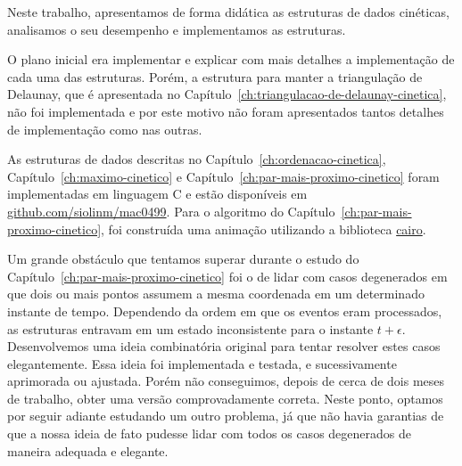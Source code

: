 
\label{cap:conclusao}

Neste trabalho, apresentamos de forma didática as estruturas de dados cinéticas, analisamos o seu desempenho e
implementamos as estruturas.

O plano inicial era implementar e explicar com mais detalhes a implementação de cada uma das estruturas.
Porém, a estrutura para manter a triangulação de Delaunay, que é apresentada no
Capítulo~\ref{ch:triangulacao-de-delaunay-cinetica}, não foi implementada e por este motivo não foram apresentados
tantos detalhes de implementação como nas outras.

As estruturas de dados descritas no Capítulo~\ref{ch:ordenacao-cinetica},
Capítulo~\ref{ch:maximo-cinetico} e Capítulo~\ref{ch:par-mais-proximo-cinetico} foram implementadas
em linguagem C e estão disponíveis em \href{https://github
.com/siolinm/mac0499/tree/main/implementacao}{github.com/siolinm/mac0499}.
Para o algoritmo do Capítulo~\ref{ch:par-mais-proximo-cinetico}, foi construída uma animação
utilizando a biblioteca \href{https://www.cairographics.org/}{cairo}.

Um grande obstáculo que tentamos superar durante o estudo do Capítulo~\ref{ch:par-mais-proximo-cinetico}
foi o de lidar com casos degenerados em que dois ou mais pontos assumem a mesma coordenada em um
determinado instante de tempo.
Dependendo da ordem em que os eventos eram processados, as estruturas entravam em um estado inconsistente para
o instante $t + \epsilon$.
Desenvolvemos uma ideia combinatória original para tentar resolver estes casos elegantemente.
Essa ideia foi implementada e testada, e sucessivamente aprimorada ou ajustada.
Porém não conseguimos, depois de cerca de dois meses de trabalho, obter uma versão comprovadamente correta.
Neste ponto, optamos por seguir adiante estudando um outro problema, já que não havia garantias de que a nossa ideia
de fato pudesse lidar com todos os casos degenerados de maneira adequada e elegante.

